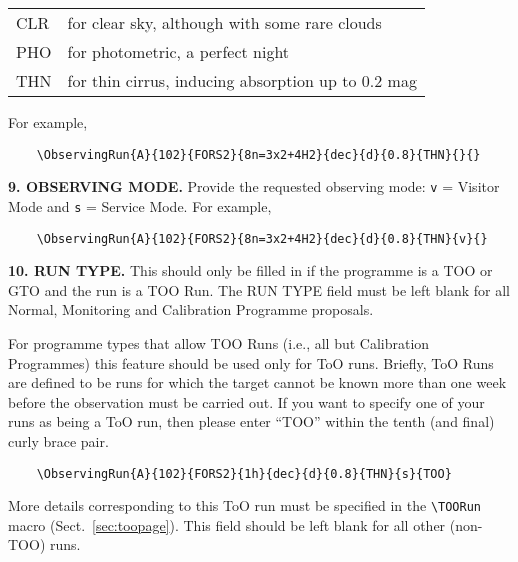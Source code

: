 \documentclass{article}
\begin{document}
\smallskip

\begin{tabular}{ll}
  CLR & for clear sky, although with some rare clouds \\
  PHO & for photometric, a perfect night \\
  THN & for thin cirrus, inducing absorption up to 0.2 mag \\
\end{tabular}

\smallskip

For example, 
\begin{verbatim}
    \ObservingRun{A}{102}{FORS2}{8n=3x2+4H2}{dec}{d}{0.8}{THN}{}{}
\end{verbatim}

\medskip

{\bf 9. OBSERVING MODE.} Provide the requested observing mode:
\verb|v| = Visitor Mode and \verb|s| = Service Mode. For example,
\begin{verbatim}
    \ObservingRun{A}{102}{FORS2}{8n=3x2+4H2}{dec}{d}{0.8}{THN}{v}{}
\end{verbatim}

{\bf 10. RUN TYPE.}
This should only be filled in if the programme is a TOO or GTO 
and the run is a TOO Run.  The RUN TYPE field must be left blank 
for all Normal, Monitoring and Calibration Programme proposals.

For programme types that allow TOO Runs (i.e., all but Calibration Programmes) this feature should be used only for ToO runs.
Briefly, ToO Runs are defined to be runs for which the target cannot be known more than
one week before the observation must be carried out.
If you want to specify one of your runs 
as being a ToO run, then please enter ``TOO'' within the tenth (and final) curly brace pair.

\begin{verbatim}
    \ObservingRun{A}{102}{FORS2}{1h}{dec}{d}{0.8}{THN}{s}{TOO}
\end{verbatim}

More details corresponding to this ToO run must be specified in the
\verb|\TOORun| macro (Sect.~\ref{sec:toopage}).
This field should be left blank for all other (non-TOO) runs.
\end{document}
